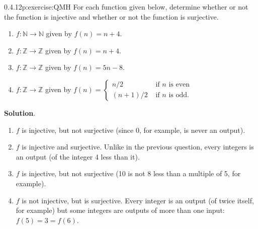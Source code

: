 \documentclass[twoside,11pt,]{book}
\newcommand{\blocktitlefont}{\relax}
\numberwithin{equation}{chapter}
\newcommand{\N}{\mathbb N}
\newcommand{\Z}{\mathbb Z}
\newcommand{\amp}{&}
\begin{document}
\begin{divisionsolution}{0.4.12}{}{p:exercise:QMH}%
For each function given below, determine whether or not the function is injective and whether or not the function is surjective.%
\begin{enumerate}[label=(\alph*)]
\item{}\(f:\N \to \N\) given by \(f(n) = n+4\).%
\item{}\(f:\Z \to \Z\) given by \(f(n) = n+4\).%
\item{}\(f:\Z \to \Z\) given by \(f(n) = 5n - 8\).%
\item{}\(f:\Z \to \Z\) given by \(f(n) = \begin{cases}n/2 \amp \text{ if } n \text{ is even} \\ (n+1)/2 \amp \text{ if } n \text{ is odd} . \end{cases}\)%
\end{enumerate}
%
\par\smallskip%
\noindent\textbf{\blocktitlefont Solution}.\quad{}%
\begin{enumerate}[label=(\alph*)]
\item{}\(f\) is injective, but not surjective (since 0, for example, is never an output).%
\item{}\(f\) is injective and surjective. Unlike in the previous question, every integers is an output (of the integer 4 less than it).%
\item{}\(f\) is injective, but not surjective (10 is not 8 less than a multiple of 5, for example).%
\item{}\(f\) is not injective, but is surjective. Every integer is an output (of twice itself, for example) but some integers are outputs of more than one input: \(f(5) = 3 = f(6)\).%
\end{enumerate}
%
\end{divisionsolution}%
\end{document}
